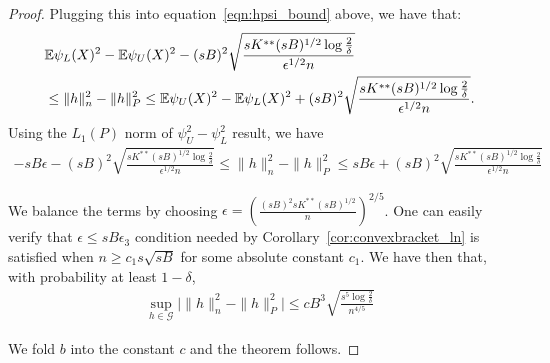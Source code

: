 \begin{proof}
Plugging this into equation~\eqref{eqn:hpsi_bound} above, we have that:
\begin{align*}
& {\mathbb E} \psi_L(X)^2 - {\mathbb E} \psi_U(X)^2 - 
(sB)^2 \sqrt{ \frac{ sK^{**} (sB)^{1/2} \log \frac{2}{\delta}}{ \epsilon^{1/2} n} } \\
 & \leq 
 \| h \|_n^2 - \| h \|_P^2 \leq
{\mathbb E} \psi_U(X)^2 - {\mathbb E} \psi_L(X)^2 + 
(sB)^2 \sqrt{ \frac{ sK^{**} (sB)^{1/2} \log \frac{2}{\delta}}{ \epsilon^{1/2} n} }.
\end{align*}
Using the $L_1(P)$ norm of $\psi_U^2 - \psi_L^2$ result, we have
\begin{align*}
-sB\epsilon - 
(sB)^2 \sqrt{ \frac{ sK^{**} (sB)^{1/2} \log \frac{2}{\delta}}{ \epsilon^{1/2} n} } \leq 
 \| h \|_n^2 - \| h \|_P^2 \leq
sB\epsilon + 
(sB)^2 \sqrt{ \frac{ sK^{**} (sB)^{1/2} \log \frac{2}{\delta}}{ \epsilon^{1/2} n} }
\end{align*}

We balance the terms by choosing $\epsilon = \left( \frac{ (sB)^2 sK^{**} (sB)^{1/2}}{n} \right)^{2/5}$. One can easily verify that $\epsilon \leq sB \epsilon_3$ condition needed by Corollary~\ref{cor:convexbracket_ln} is satisfied when $n \geq c_1 s \sqrt{sB}$ for some absolute constant $c_1$.
We have then that, with probability at least $1-\delta$,
\begin{align*}
\sup_{h \in \mathcal{G}} \big| \| h \|_n^2 - \| h \|_P^2  \big| \leq
  c B^3 \sqrt{ \frac{s^5 \log \frac{2}{\delta}}{n^{4/5}}}
\end{align*}

We fold $b$ into the constant $c$ and the theorem follows. 





\end{proof}
